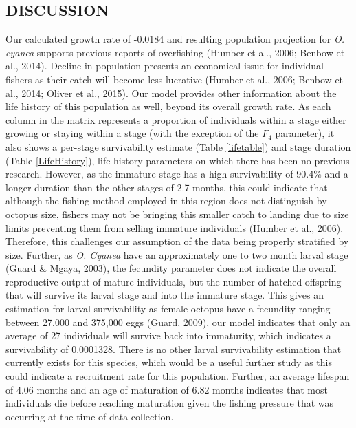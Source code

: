 \documentclass[
]{article}
\begin{document}
\hypertarget{discussion}{%
\subsection{DISCUSSION}\label{discussion}}

Our calculated growth rate of -0.0184 and resulting population projection for \emph{O. cyanea} supports previous reports of overfishing (Humber et al., 2006; Benbow et al., 2014). Decline in population presents an economical issue for individual fishers as their catch will become less lucrative (Humber et al., 2006; Benbow et al., 2014; Oliver et al., 2015). Our model provides other information about the life history of this population as well, beyond its overall growth rate. As each column in the matrix represents a proportion of individuals within a stage either growing or staying within a stage (with the exception of the \(F_4\) parameter), it also shows a per-stage survivability estimate (Table \ref{lifetable}) and stage duration (Table \ref{LifeHistory}), life history parameters on which there has been no previous research. However, as the immature stage has a high survivability of 90.4\% and a longer duration than the other stages of 2.7 months, this could indicate that although the fishing method employed in this region does not distinguish by octopus size, fishers may not be bringing this smaller catch to landing due to size limits preventing them from selling immature individuals (Humber et al., 2006). Therefore, this challenges our assumption of the data being properly stratified by size. Further, as \emph{O. Cyanea} have an approximately one to two month larval stage (Guard \& Mgaya, 2003), the fecundity parameter does not indicate the overall reproductive output of mature individuals, but the number of hatched offspring that will survive its larval stage and into the immature stage. This gives an estimation for larval survivability as female octopus have a fecundity ranging between 27,000 and 375,000 eggs (Guard, 2009), our model indicates that only an average of 27 individuals will survive back into immaturity, which indicates a survivability of 0.0001328. There is no other larval survivability estimation that currently exists for this species, which would be a useful further study as this could indicate a recruitment rate for this population. Further, an average lifespan of 4.06 months and an age of maturation of 6.82 months indicates that most individuals die before reaching maturation given the fishing pressure that was occurring at the time of data collection.
\end{document}
